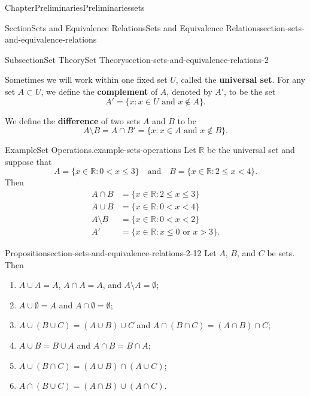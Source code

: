 \documentclass[oneside,10pt,]{book}
\newcommand{\terminology}[1]{\textbf{#1}}
\numberwithin{equation}{section}
\newcommand{\lt}{<}
\newcommand{\gt}{>}
\begin{document}
\begin{chapterptx}{Chapter}{Preliminaries}{}{Preliminaries}{}{}{sets}
\begin{sectionptx}{Section}{Sets and Equivalence Relations}{}{Sets and Equivalence Relations}{}{}{section-sets-and-equivalence-relations}
\begin{subsectionptx}{Subsection}{Set Theory}{}{Set Theory}{}{}{section-sets-and-equivalence-relations-2}
\par
Sometimes we will work within one fixed set \(U\), called the \terminology{universal set}.  For any set \(A \subset U\), we define the \terminology{complement} of \(A\), denoted by \(A'\), to be the set \label{section-sets-and-equivalence-relations-2-9-7}%
\begin{equation*}
A' = \{ x : x \in U \text{ and } x \notin A \}\text{.}
\end{equation*}
%
\par
We define the \terminology{difference} of two sets \(A\) and \(B\) to be \label{section-sets-and-equivalence-relations-2-10-4}%
\begin{equation*}
A \setminus B = A \cap B'  = \{ x : x \in A \text{ and } x \notin B \}\text{.}
\end{equation*}
%
\begin{example}{Example}{Set Operations.}{example-sets-operations}%
Let \({\mathbb R}\) be the universal set and suppose that%
\begin{equation*}
A = \{ x \in {\mathbb R} : 0 \lt x \leq 3 \} \quad \text{and} \quad B = \{ x \in {\mathbb R} : 2 \leq x \lt 4 \}\text{.}
\end{equation*}
Then%
\begin{align*}
A \cap B & =  \{ x \in {\mathbb R} : 2 \leq x \leq 3 \}\\
A \cup B & =  \{ x \in {\mathbb R} : 0 \lt x \lt 4 \}\\
A \setminus B & =  \{ x \in {\mathbb R} : 0 \lt x \lt 2  \}\\
A' & =  \{ x \in {\mathbb R} : x \leq 0 \text{ or } x \gt 3 \}\text{.}
\end{align*}
%
\end{example}
\begin{proposition}{Proposition}{}{}{section-sets-and-equivalence-relations-2-12}%
Let \(A\), \(B\), and \(C\) be sets. Then%
\begin{enumerate}
\item{}\(A \cup A = A\), \(A \cap A = A\), and \(A \setminus A = \emptyset\);%
\item{}\(A \cup \emptyset = A\) and \(A \cap \emptyset = \emptyset\);%
\item{}\(A \cup (B \cup C) = (A \cup B) \cup C\) and  \(A \cap (B \cap C) = (A \cap B) \cap C\);%
\item{}\(A \cup B = B \cup A\) and \(A \cap B = B \cap A\);%
\item{}\(A \cup (B \cap C) = (A \cup B) \cap (A \cup C)\);%
\item{}\(A \cap (B \cup C) = (A \cap B) \cup (A \cap C)\).%

\end{enumerate}
\end{proposition}
\end{subsectionptx}
\end{sectionptx}
\end{chapterptx}
\end{document}
